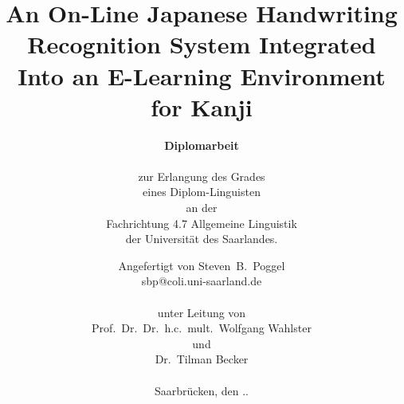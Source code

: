 \documentclass[a4paper]{book}
\title{An On-Line Japanese Handwriting Recognition System Integrated Into an E-Learning Environment for Kanji}
\author{\textbf{\large Diplomarbeit} \\
\textsc{ } \\
zur Erlangung des Grades \\
eines Diplom-Linguisten\\
an der \\
Fachrichtung 4.7 Allgemeine Linguistik \\ 
der Universität des Saarlandes.}
\date{
Angefertigt von
Steven~B.~Poggel\\
sbp@coli.uni-saarland.de \\
\textsc{ } \\
unter Leitung von \\
Prof.~Dr.~Dr.~h.c.~mult.~Wolfgang Wahlster \\
und \\
Dr.~Tilman Becker \\
\textsc{ } \\
Saarbrücken, den \the\day.\the\month.\the\year}
\begin{document}

\appendix
 \listoffigures
 \lstlistoflistings
 \listoftables
 
\end{document}
